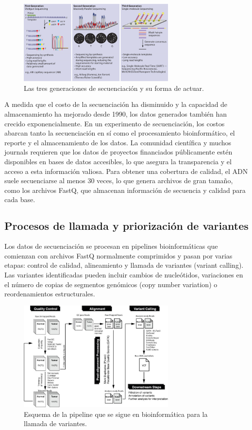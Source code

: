 \begin{figure}[htbp]
\centering
\includegraphics[width = 0.7\textwidth]{figs/sequencing-generations.png}
\caption{Las tres generaciones de secuenciación y su forma de actuar.}
\end{figure}

A medida que el costo de la secuenciación ha disminuido y la capacidad de almacenamiento ha mejorado desde 1990, los datos generados también han crecido exponencialmente. En un experimento de secuenciación, los costos abarcan tanto la secuenciación en sí como el procesamiento bioinformático, el reporte y el almacenamiento de los datos. La comunidad científica y muchos journals requieren que los datos de proyectos financiados públicamente estén disponibles en bases de datos accesibles, lo que asegura la transparencia y el acceso a esta información valiosa. Para obtener una cobertura de calidad, el ADN suele secuenciarse al menos 30 veces, lo que genera archivos de gran tamaño, como los archivos FastQ, que almacenan información de secuencia y calidad para cada base.

\subsection{Procesos de llamada y priorización de variantes}
Los datos de secuenciación se procesan en pipelines bioinformáticas que comienzan con archivos FastQ normalmente comprimidos y pasan por varias etapas: control de calidad, alineamiento y llamada de variantes (variant calling). Las variantes identificadas pueden incluir cambios de nucleótidos, variaciones en el número de copias de segmentos genómicos (copy number variation) o reordenamientos estructurales.

\begin{figure}[htbp]
\centering
\includegraphics[width = 0.7\textwidth]{figs/bioinfo-pipeline.png}
\caption{Esquema de la pipeline que se sigue en bioinformática para la llamada de variantes.}
\end{figure}

